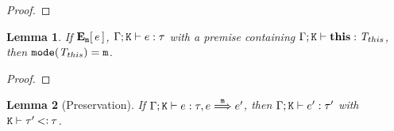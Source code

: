 \documentclass[onecolumn,nocopyrightspace]{sigplanconf}
\newtheorem{lemma}{Lemma}
\theoremstyle{lessintrusive}
\theoremstyle{plain}
\theoremstyle{custom}
\begin{document}
\begin{proof}
\end{proof}

\begin{lemma}
\label{pf:this-equals-context-mode}
If ${\bf E}_{\mathtt{m}}[\, e \,]$, $\Gamma;\mathtt{K}\vdash e:\tau$ with a premise containing $\Gamma;\mathtt{K}\vdash\texttt{\bf this}:\mathit{T}_{this}$, then $\mathtt{mode}(\mathit{T}_{this}) = \mathtt{m}$.
\end{lemma}


\begin{proof}
\end{proof}


\begin{lemma}[Preservation]
\label{pf:typepreservation}
If $\Gamma;\mathtt{K} \vdash e : \tau, e \stackrel{\mathtt{m}}{\Longrightarrow} e'$, then $\Gamma;\mathtt{K} \vdash e' : \tau'$ with $\mathtt{K}\vdash\tau'\mathbin{<\vcentcolon}\tau$.
\end{lemma} 
\end{document}
